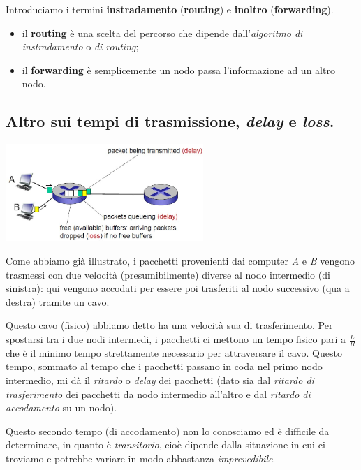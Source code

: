 \documentclass[10pt, a4paper, openany]{book}
\begin{document}
\noindent Introduciamo i termini \textbf{instradamento} (\textbf{routing}) e \textbf{inoltro} (\textbf{forwarding}).

\begin{itemize}
    \item il \textbf{routing} è una scelta del percorso che dipende dall'\textit{algoritmo di instradamento} o \textit{di routing};
    \item il \textbf{forwarding} è semplicemente un nodo passa l'informazione ad un altro nodo.
\end{itemize}

\subsection{Altro sui tempi di trasmissione, \textit{delay} e \textit{loss}.}

\begin{center}
    \includegraphics[width=75mm]{cap1 - Introduzione alle reti - 21.jpg}
\end{center}
\noindent Come abbiamo già illustrato, i pacchetti provenienti dai computer \textit{A} e \textit{B} vengono trasmessi con due velocità (presumibilmente) diverse al nodo intermedio (di sinistra): qui vengono accodati per essere poi trasferiti al nodo successivo (qua a destra) tramite un cavo.

\noindent Questo cavo (fisico) abbiamo detto ha una velocità sua di trasferimento. Per spostarsi tra i due nodi intermedi, i pacchetti ci mettono un tempo fisico pari a $\frac{L}{R}$ che è il minimo tempo strettamente necessario per attraversare il cavo. Questo tempo, sommato al tempo che i pacchetti passano in coda nel primo nodo intermedio, mi dà il \textit{ritardo} o \textit{delay} dei pacchetti (dato sia dal \textit{ritardo di trasferimento} dei pacchetti da nodo intermedio all'altro e dal \textit{ritardo di accodamento} su un nodo).

\noindent Questo secondo tempo (di accodamento) non lo conosciamo ed è difficile da determinare, in quanto è \textit{transitorio}, cioè dipende dalla situazione in cui ci troviamo e potrebbe variare in modo abbastanza \textit{imprevedibile}.
\end{document}
